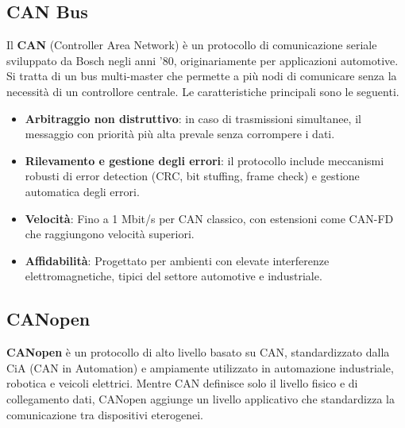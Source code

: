 \subsection{CAN Bus}
Il \textbf{CAN} (Controller Area Network) \cite{iso11898_1} è un protocollo di comunicazione seriale sviluppato da Bosch negli anni '80, originariamente per applicazioni automotive. Si tratta di un bus multi-master che permette a più nodi di comunicare senza la necessità di un controllore centrale. Le caratteristiche principali sono le seguenti.
\begin{itemize}
    \item \textbf{Arbitraggio non distruttivo}: in caso di trasmissioni simultanee, il messaggio con priorità più alta prevale senza corrompere i dati.
    \item \textbf{Rilevamento e gestione degli errori}: il protocollo include meccanismi robusti di error detection (CRC, bit stuffing, frame check) e gestione automatica degli errori.
    \item \textbf{Velocità}: Fino a 1 Mbit/s per CAN classico, con estensioni come CAN-FD che raggiungono velocità superiori.
    \item \textbf{Affidabilità}: Progettato per ambienti con elevate interferenze elettromagnetiche, tipici del settore automotive e industriale.
\end{itemize}

\subsection{CANopen}
\textbf{CANopen} \cite{cia301} è un protocollo di alto livello basato su CAN, standardizzato dalla CiA (CAN in Automation) e ampiamente utilizzato in automazione industriale, robotica e veicoli elettrici. Mentre CAN definisce solo il livello fisico e di collegamento dati, CANopen aggiunge un livello applicativo che standardizza la comunicazione tra dispositivi eterogenei.

